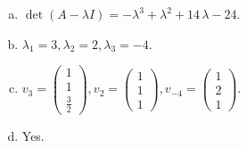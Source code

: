 \begin{questions}
\begin{solution}
\begin{enumerate}[(a)]
\item $\det(A-\lambda I)=-{\lambda}^{3} + {\lambda}^{2} + 14 \, {\lambda} - 24$.
\item ${\lambda}_1=3, {\lambda}_2=2, {\lambda}_3=-4$.
\item $v_{3}=\left(\begin{array}{r}
1 \\
1 \\
\frac{3}{2}
\end{array}\right), v_{2}=\left(\begin{array}{r}
1 \\
1 \\
1
\end{array}\right), v_{-4}=\left(\begin{array}{r}
1 \\
2 \\
1
\end{array}\right)$.
\item Yes.
\end{enumerate}
\end{solution}

\end{questions}

\newpage


\begin{center}
\end{center}

